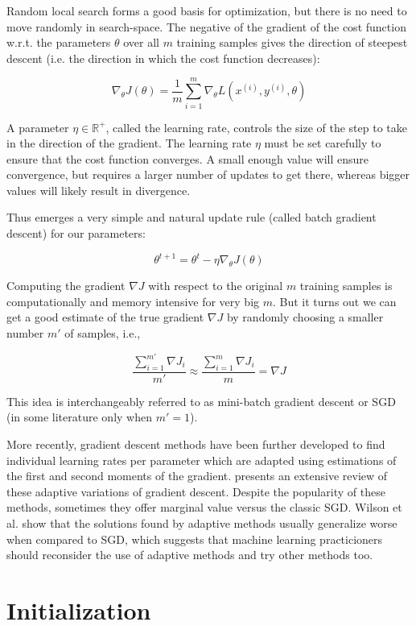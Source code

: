 Random local search forms a good basis for optimization, but there is no need to move randomly in search-space. The negative of the gradient of the cost function w.r.t. the parameters $\theta$ over all $m$ training samples gives the direction of steepest descent (i.e. the direction in which the cost function decreases):

$$
\nabla_{\theta} J(\theta) = \frac{1}{m} \sum_{i=1}^{m} \nabla_{\theta} L(x^{(i)}, y^{(i)}, \theta)
$$

A parameter $\eta \in \mathbb{{R}^{+}}$, called the learning rate, controls the size of the step to take in the direction of the gradient.
The learning rate $\eta$ must be set carefully to ensure that the cost function converges. A small enough value will ensure convergence, but requires a larger number of updates to get there, whereas bigger values will likely result in divergence.

Thus emerges a very simple and natural update rule (called batch gradient descent) for our parameters:

$$
\theta^{t+1} = \theta^t - \eta \nabla_{\theta} J(\theta)
$$

Computing the gradient $\nabla J$ with respect to the original $m$ training samples is computationally and memory intensive for very big $m$. But it turns out we can get a good estimate of the true gradient $\nabla J$ by randomly choosing a smaller number $m'$ of samples, i.e.,

$$
\frac{\sum_{i=1}^{m'} \nabla J_i}{m'} \approx \frac{\sum_{i=1}^m \nabla J_{i}}{m} = \nabla J
$$

This idea is interchangeably referred to as mini-batch gradient descent or \ac{SGD} (in some literature only when $m' = 1$).

More recently, gradient descent methods have been further developed to find individual learning rates per parameter which are adapted using estimations of the first and second moments of the gradient. \citeauthor{ruder2016} \cite{ruder2016} presents an extensive review of these adaptive variations of gradient descent. Despite the popularity of these methods, sometimes they offer marginal value versus the classic \ac{SGD}. Wilson et al. \cite{wilson2017} show that the solutions found by adaptive methods usually generalize worse when compared to \ac{SGD}, which suggests that machine learning practicioners should reconsider the use of adaptive methods and try other methods too.

\section{Initialization}

